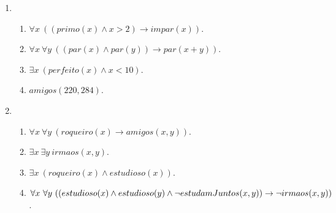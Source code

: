     \begin{enumerate}
        \item
        \begin{enumerate}
            \item $\forall x \ ((primo(x) \land x > 2) \rightarrow impar(x))$.
            \item $\forall x \ \forall y \ ((par(x) \land par(y)) \rightarrow par(x + y))$.
            \item $\exists x \ (perfeito(x) \land x < 10)$.
            \item $amigos(220, 284)$.
        \end{enumerate}
        \item
        \begin{enumerate}
            \item $\forall x \ \forall y \ (roqueiro(x) \rightarrow amigos(x, y))$.
            \item $\exists x \ \exists y \ irmaos(x, y)$.
            \item $\exists x \ (roqueiro(x) \land estudioso(x))$.
            \item $\forall x \ \forall y \ ((estudioso(x) \land estudioso(y) \land \lnot estudamJuntos(x, y)) \rightarrow \\ \lnot irmaos(x, y))$.
        \end{enumerate}
    \end{enumerate}